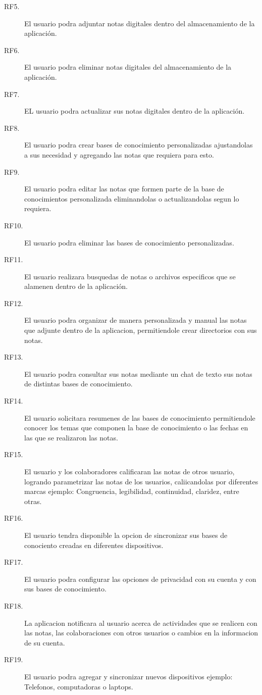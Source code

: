 \begin{description}
    \item[RF5.] El usuario podra adjuntar notas digitales dentro del almacenamiento de la aplicación.
    \item[RF6.] El usuario podra eliminar notas digitales del almacenamiento de la aplicación.
    \item[RF7.] EL usuario podra actualizar sus notas digitales dentro de la aplicación.
    \item[RF8.] El usuario podra crear bases de conocimiento personalizadas ajustandolas a sus necesidad y agregando las notas que requiera para esto.
    \item[RF9.] El usuario podra editar las notas que formen parte de la base de conocimientos personalizada eliminandolas o actualizandolas segun lo requiera.
    \item[RF10.] El usuario podra eliminar las bases de conocimiento personalizadas.
    \item[RF11.] El usuario realizara busquedas de notas o archivos especificos que se alamenen dentro de la aplicación.
    \item[RF12.] El usuario podra organizar de manera personalizada y manual las notas que adjunte dentro de la aplicacion, permitiendole crear directorios con sus notas.
    \item[RF13.] El usuario podra consultar sus notas mediante un chat de texto sus notas de distintas bases de conocimiento.
    \item[RF14.] El usuario solicitara resumenes de las bases de conocimiento permitiendole conocer los temas que componen la base de conocimiento o las fechas en las que se realizaron las notas.
    \item[RF15.] El usuario y los colaboradores calificaran las notas de otros usuario, logrando parametrizar las notas de los usuarios, caliicandolas por diferentes marcas ejemplo: Congruencia, legibilidad, continuidad, claridez, entre otras.
    \item[RF16.] El usuario tendra disponible la opcion de sincronizar sus bases de conociento creadas en diferentes dispositivos.
    \item[RF17.] El usuario podra configurar las opciones de privacidad con su cuenta y con sus bases de conocimiento.
    \item[RF18.] La aplicacion notificara al usuario acerca de actividades que se realicen con las notas, las colaboraciones con otros usuarios o cambios en la informacion de su cuenta.
    \item[RF19.] El usuario podra agregar y sincronizar nuevos dispositivos ejemplo: Telefonos, computadoras o laptops.

\end{description}
